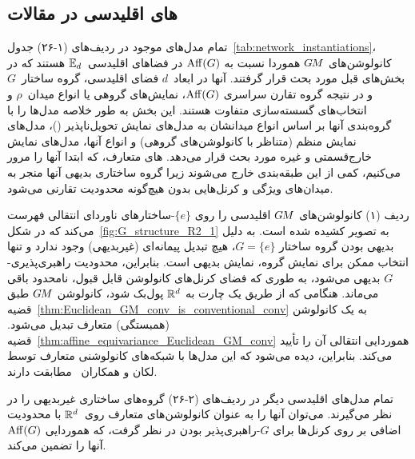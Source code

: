 

\subsection{های اقلیدسی در مقالات}
\label{sec:euclidean_literature}

تمام مدل‌های موجود در ردیف‌های (۱-۲۶) جدول~\ref{tab:network_instantiations}، کانولوشن‌های $G\mkern-1.4muM$ هموردا نسبت به $\operatorname{Aff}(G)$ در فضاهای اقلیدسی~$\mathbb{E}_d$ هستند که در بخش‌های قبل مورد بحث قرار گرفتند.
آنها در ابعاد~$d$ فضای اقلیدسی، گروه ساختار~$G$ و در نتیجه گروه تقارن سراسری $\operatorname{Aff}(G)$، نمایش‌های گروهی یا انواع میدان~$\rho$ و انتخاب‌های گسسته‌سازی متفاوت هستند.
این بخش به طور خلاصه مدل‌ها را با گروه‌بندی آنها بر اساس انواع میدانشان به مدل‌های نمایش تحویل‌ناپذیر ()، مدل‌های نمایش منظم (متناظر با کانولوشن‌های گروهی) و انواع آنها، مدل‌های نمایش خارج‌قسمتی و غیره مورد بحث قرار می‌دهد.
های متعارف، که ابتدا آنها را مرور می‌کنیم، کمی از این طبقه‌بندی خارج می‌شوند زیرا گروه ساختاری بدیهی آنها منجر به میدان‌های ویژگی و کرنل‌هایی بدون هیچ‌گونه محدودیت تقارنی می‌شود.


ردیف (۱) کانولوشن‌های $G\mkern-1.4muM$ اقلیدسی را روی $\{e\}$-ساختارهای ناوردای انتقالی فهرست می‌کند که در شکل~\ref{fig:G_structure_R2_1} به تصویر کشیده شده است.
به دلیل بدیهی بودن گروه ساختار $G=\{e\}$، هیچ تبدیل پیمانه‌ای (غیربدیهی) وجود ندارد و تنها انتخاب ممکن برای نمایش گروه، نمایش بدیهی است.
بنابراین، محدودیت راهبری‌پذیری-$G$ بدیهی می‌شود، به طوری که فضای کرنل‌های کانولوشن قابل قبول، نامحدود باقی می‌ماند.
هنگامی که از طریق یک چارت به $\mathbb{R}^d$ پول‌بک شود، کانولوشن $G\mkern-1.4muM$ طبق قضیه~\ref{thm:Euclidean_GM_conv_is_conventional_conv} به یک کانولوشن (همبستگی) متعارف تبدیل می‌شود.
قضیه~\ref{thm:affine_equivariance_Euclidean_GM_conv} هموردایی انتقالی آن را تأیید می‌کند.
بنابراین، دیده می‌شود که این مدل‌ها با شبکه‌های کانولوشنی متعارف توسط لکان و همکاران~\cite{LeCun1990CNNs} مطابقت دارند.


تمام مدل‌های اقلیدسی دیگر در ردیف‌های (۲-۲۶) گروه‌های ساختاری غیربدیهی را در نظر می‌گیرند.
می‌توان آنها را به عنوان کانولوشن‌های متعارف روی~$\mathbb{R}^d$ با محدودیت اضافی بر روی کرنل‌ها برای $G$-راهبری‌پذیر بودن در نظر گرفت، که هموردایی $\operatorname{Aff}(G)$ آنها را تضمین می‌کند.


